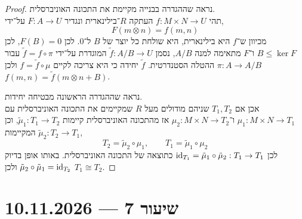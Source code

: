 \begin{proof}
	נראה שההגדרה בבנייה מקיימת את התכונה האוניברסלית. \\
	תהי $f : M \times N \to U$ העתקה $R$־בילינארית ונגדיר $F : A \to U$ על־ידי,
	\[
		F(m \otimes n)
		= f(m, n)
	\]
	מכיוון ש־$f$ היא בילינארית, היא שולחת כל יוצר של $B$ ל־$0$.
	לכן $F(B) = 0$, לכן $B \le \ker F$ ו־$F$ מתאימה למנה $A / B$, נסמן $\tilde{f} : A / B \to U$ המוגדרת על־ידי $\tilde{f} = f \circ \pi$ עבור $\pi : A \to A / B$ ההטלה הסטנדרטית.
	$\tilde{f}$ יחידה כי היא צריכה לקיים $f = \tilde{f} \circ \mu$ ולכן $f(m, n) = \tilde{f}(m \otimes n + B)$.

	נראה שההגדרה הראשונה מבטיחה יחידות. \\
	אכן אם $T_1, T_2$ שניהם מודולים מעל $R$ שמקיימים את התכונה האוניברסלית עם $\mu_1 : M \times N \to T_1$ ו־$\mu_2 : M \times N \to T_2$ אז מהתכונה האוניברסלית קיימות $\tilde{\mu}_1 : T_1 \to T_2$,
	וכן $\tilde{\mu}_2 : T_2 \to T_1$ המקיימות,
	\[
		T_2 = \tilde{\mu}_2 \circ \mu_1,
		\qquad
		T_1 = \tilde{\mu}_1 \circ \mu_2
	\]
	לכן $\operatorname{id}_{T_1} = \tilde{\mu}_1 \circ \tilde{\mu}_2 : T_1 \to T_1$ כתוצאה של התכונה האוניברסלית.
	באותו אופן בדיוק $\tilde{\mu}_2 \circ \tilde{\mu}_1 = \operatorname{id}_{T_2}$ ולכן $T_1 \cong T_2$.
\end{proof}

\section{שיעור 7 --- 10.11.2026}
